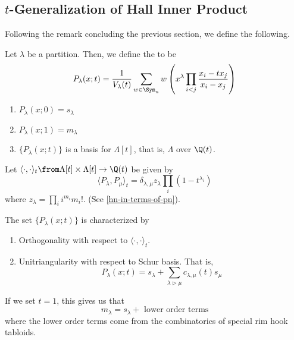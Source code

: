\documentclass[11pt,leqno,oneside]{amsart}
\numberwithin{thm}{section}
\newcommand{\strictlydominates}{\rhd}
\newcommand{\sym}{\Lambda}
\begin{document}
\subsection{\(t\)-Generalization of Hall Inner Product}
Following the remark concluding the previous section, we define the
following.
\begin{defn}
  Let \(\lambda\) be a partition. Then, we define the
   to be \[
    P_\lambda(x;t) = \frac{1}{V_\lambda(t)} \sum_{w \in \Sym_n} w
    \left( x^\lambda \prod_{i < j} \frac{x_i-tx_j}{x_i-x_j}\right)
  \]
\end{defn}
\begin{prop}
  \begin{enumerate}
  \item \(P_\lambda(x;0) = s_\lambda\)
  \item \(P_\lambda(x;1) = m_\lambda\)
  \item \(\{P_\lambda(x;t)\}\) is a basis for \(\sym[t]\), that is,
    \(\sym\) over \(\Q(t)\). 
  \end{enumerate}
\end{prop}
\begin{defn}
  Let \(\langle \cdot, \cdot \rangle_t \from \sym[t] \times \sym[t]
  \to \Q(t)\) be given by \[
    \langle P_\lambda, P_\mu \rangle_t = \delta_{\lambda,\mu}
    z_\lambda \prod_{i} (1-t^{\lambda_i})
  \]
  where \(z_\lambda = \prod_i i^{m_i} m_i!\). (See
  \ref{hn-in-terms-of-pn}). 
\end{defn}
\begin{prop}
  The set \(\{P_\lambda(x;t)\}\) is characterized by
  \begin{enumerate}
  \item Orthogonality with respect to \(\langle \cdot, \cdot
    \rangle_t\).
  \item Unitriangularity with respect to Schur basis. That is, \[
      P_\lambda(x;t) = s_\lambda + \sum_{\lambda \strictlydominates
        \mu} c_{\lambda,\mu}(t) s_\mu
    \]
  \end{enumerate}
\end{prop}
\begin{cor}
  If we set \(t=1\), this gives us that \[
    m_\lambda = s_\lambda + \text{ lower order terms}
  \]
  where the lower order terms come from the combinatorics of special
  rim hook tabloids.
\end{cor}
\end{document}
